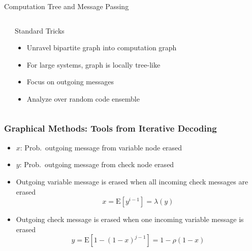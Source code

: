 \documentclass[10pt]{beamer}
\begin{document}
\begin{frame}{Computation Tree and Message Passing}
\begin{columns}
\begin{centering}
\scalebox{0.7}{}
\end{centering}
\begin{block}{Standard Tricks}
\begin{itemize}
\item Unravel bipartite graph into computation graph
\item For large systems, graph is locally tree-like
\item Focus on outgoing messages
\item Analyze over random code ensemble
\end{itemize}
\end{block}
\end{columns}
\end{frame}


\begin{frame}
\frametitle{Graphical Methods: Tools from Iterative Decoding}
\begin{itemize}
\item $x$: Prob.\ outgoing message from variable node erased
\item $y$: Prob.\ outgoing message from check node erased
\end{itemize}
\begin{center}
\scalebox{0.7}{}
\end{center}
\begin{itemize}
\item Outgoing variable message is erased when all incoming check messages are erased
\begin{equation*}
x = \mathrm{E} \left[ y^{i-1} \right] = \lambda (y)
\end{equation*}
\item Outgoing check message is erased when one incoming variable message is erased
\begin{equation*}
y = \mathrm{E} \left[ 1 - (1 - x)^{j-1} \right] = 1 - \rho(1-x)
\end{equation*}
\end{itemize}
\end{frame}
\end{document}
